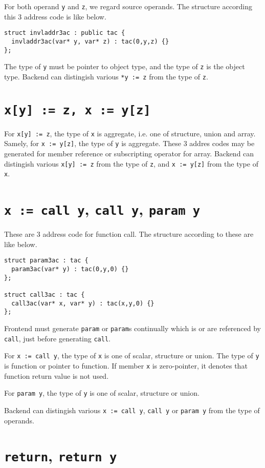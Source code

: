 For both operand {\tt{y}} and {\tt{z}}, we regard source operands.
The structure according this 3 address code is like below.
\begin{verbatim}
struct invladdr3ac : public tac {
  invladdr3ac(var* y, var* z) : tac(0,y,z) {}
};
\end{verbatim}
The type of {\tt{y}} must be pointer to object type,
and the type of {\tt{z}} is the object type.
Backend can distingish various {\tt{*y := z}} from the type of {\tt{z}}.

\section{\tt{x[y] := z}, \tt{x := y[z]}}
\label{3ac_e004}
For {\tt{x[y] := z}}, the type of {\tt{x}} is aggregate, i.e.
one of structure, union and array.
Samely, for {\tt{x := y[z]}}, the type of {\tt{y}} is aggregate.
These 3 addres codes may be
generated for member reference or subscripting operator for array.
Backend can distingish various {\tt{x[y] := z}} from the type of
{\tt{z}}, and {\tt{x := y[z]}} from the type of {\tt{x}}.

\section{{\tt{x := call y}}, {\tt{call y}}, {\tt{param y}}}

\label{_3ac_e000} These are 3 address code for function call.
The structure according to these are like below.
\begin{verbatim}
struct param3ac : tac {
  param3ac(var* y) : tac(0,y,0) {}
};

struct call3ac : tac {
  call3ac(var* x, var* y) : tac(x,y,0) {}
};
\end{verbatim}
Frontend must generate {\tt{param}} or {\tt{param}}s continually
which is or are referenced by {\tt{call}}, just before generating
{\tt{call}}.

For {\tt{x := call y}}, the type of {\tt{x}} is one
of scalar, structure or union.
The type of {\tt{y}} is function or pointer to function.
If member {\tt{x}} is zero-pointer, it denotes that
function return value is not used.

For {\tt {param y}}, the type of {\tt{y}} is one of
scalar, structure or union.

Backend can distingish various 
{\tt{x := call y}}, {\tt{call y}} or {\tt{param y}}
from the type of operands.

\section{{\tt{return}}, {\tt{return y}}}

